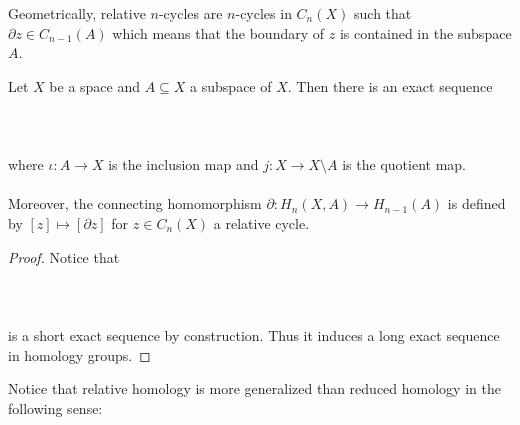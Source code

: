 \documentclass[a4paper]{article}
\begin{document}
Geometrically, relative $n$-cycles are $n$-cycles in $C_n(X)$ such that $\partial z\in C_{n-1}(A)$ which means that the boundary of $z$ is contained in the subspace $A$. 
\begin{thm}{}{} Let $X$ be a space and $A\subseteq X$ a subspace of $X$. Then there is an exact sequence \\~\\
\\~\\
where $\iota:A\to X$ is the inclusion map and $j:X\to X\setminus A$ is the quotient map. \\~\\
Moreover, the connecting homomorphism $\partial:H_n(X,A)\to H_{n-1}(A)$ is defined by $[z]\mapsto[\partial z]$ for $z\in C_n(X)$ a relative cycle. \tcbline
\begin{proof}
Notice that \\~\\
\\~\\
is a short exact sequence by construction. Thus it induces a long exact sequence in homology groups. 
\end{proof}
\end{thm}

Notice that relative homology is more generalized than reduced homology in the following sense: 
\end{document}
